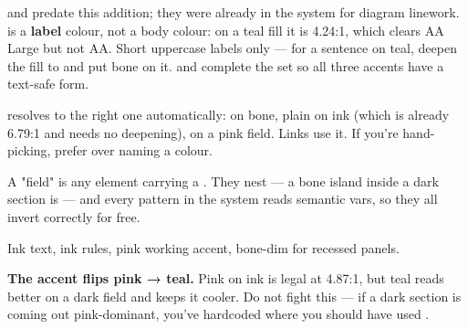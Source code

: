 \documentclass[fontpath=fonts/,logopath=logo/]{riposte-doc}
\begin{document}
 and  predate this addition; they were already in the system for diagram linework.  is a \textbf{label} colour, not a body colour: on a teal fill it is 4.24:1, which clears AA Large but not AA. Short uppercase labels only — for a sentence on teal, deepen the fill to  and put bone on it.  and  complete the set so all three accents have a text-safe form.

 resolves to the right one automatically:  on bone, plain  on ink (which is already 6.79:1 and needs no deepening),  on a pink field. Links use it. If you're hand-picking, prefer  over naming a colour.



A "field" is any element carrying a . They nest — a bone island inside a dark section is  — and every pattern in the system reads semantic vars, so they all invert correctly for free.



Ink text, ink rules, pink working accent, bone-dim for recessed panels.



\ripcodeopen
{}
\ripcodesizereset\ripcodeclose

\textbf{The accent flips pink → teal.} Pink on ink is legal at 4.87:1, but teal reads better on a dark field and keeps it cooler. Do not fight this — if a dark section is coming out pink-dominant, you've hardcoded  where you should have used .


\end{document}
